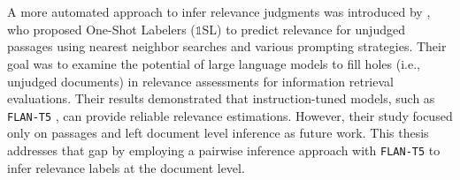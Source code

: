\\\\
A more automated approach to infer relevance judgments was introduced by \citet{macavaney:2023}, who proposed One-Shot Labelers ($\mathbb{1}$SL) to predict relevance for unjudged passages using nearest neighbor searches and various prompting strategies. Their goal was to examine the potential of large language models to fill \glqq holes\grqq{} (i.e., unjudged documents) in relevance assessments for information retrieval evaluations. Their results demonstrated that instruction-tuned models, such as \texttt{FLAN-T5} \citep{chung:2022}, can provide reliable relevance estimations. However, their study focused only on passages and left document level inference as future work. This thesis addresses that gap by employing a pairwise inference approach with \texttt{FLAN-T5} to infer relevance labels at the document level.
\\\\
